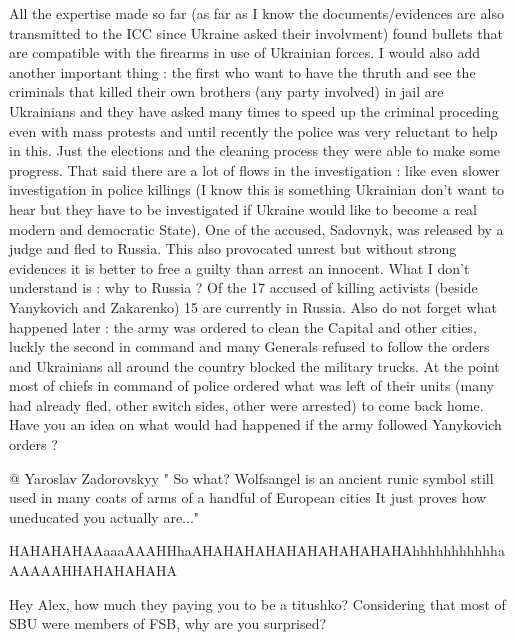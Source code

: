 \begin{itemize}
\begin{itemize}
All the expertise made so far (as far as I know the
documents/evidences are also transmitted to the ICC since Ukraine asked their
involvment) found bullets that are compatible with the firearms in use of
Ukrainian forces. I would also add another important thing : the first who want
to have the thruth and see the criminals that killed their own brothers (any
party involved) in jail are Ukrainians and they have asked many times to speed
up the criminal proceding even with mass protests and until recently the police
was very reluctant to help in this. Just the elections and the cleaning process
they were able to make some progress. That said there are a lot of flows in the
investigation : like even slower investigation in police killings (I know this
is something Ukrainian don't want to hear but they have to be investigated if
Ukraine would like to become a real modern and democratic State). One of the
accused, Sadovnyk, was released by a judge and fled to Russia. This also
provocated unrest but without strong evidences it is better to free a guilty
than arrest an innocent. What I don't understand is : why to Russia ? Of the 17
accused of killing activists (beside Yanykovich and Zakarenko) 15 are currently
in Russia. Also do not forget what happened later : the army was ordered to
clean the Capital and other cities, luckly the second in command and many
Generals refused to follow the orders and Ukrainians all around the country
blocked the military trucks. At the point most of chiefs in command of police
ordered what was left of their units (many had already fled, other switch
sides, other were arrested) to come back home. Have you an idea on what would
had happened if the army followed Yanykovich orders ?


@ Yaroslav Zadorovskyy " So what? Wolfsangel is an ancient runic symbol still
used in many coats of arms of a handful of European cities It just proves how
uneducated you actually are..."

HAHAHAHAAaaaAAAHHhaAHAHAHAHAHAHAHAHAHAHAhhhhhhhhhhhaAAAAAHHAHAHAHAHA



Hey Alex, how much they paying you to be a titushko? Considering that most of
SBU were members of FSB, why are you surprised?

\end{itemize} %

\end{itemize} %

